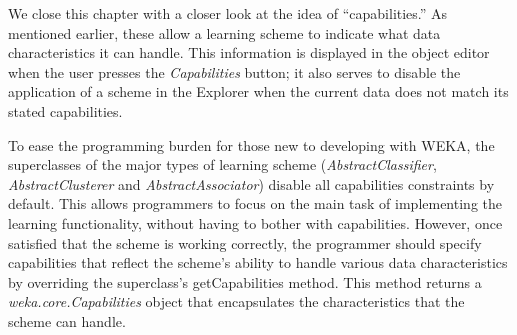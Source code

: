 We close this chapter with a closer look at the idea of
``capabilities.'' As mentioned earlier, these allow a learning scheme to
indicate what data characteristics it can handle. This information is
displayed in the object editor when the user presses the \textit{Capabilities}
button; it also serves to disable the application of a scheme in the
Explorer when the current data does not match its stated capabilities.

To ease the programming burden for those new to developing with WEKA,
the superclasses of the major types of learning scheme (\textit{AbstractClassifier},
\textit{AbstractClusterer} and \textit{AbstractAssociator}) disable all capabilities
constraints by default. This allows programmers to focus on the main
task of implementing the learning functionality, without having to
bother with capabilities. However, once satisfied that the scheme is
working correctly, the programmer should specify capabilities that
reflect the scheme's ability to handle various data characteristics by
overriding the superclass's getCapabilities method. This method
returns a \textit{weka.core.Capabilities} object that encapsulates the
characteristics that the scheme can handle.

